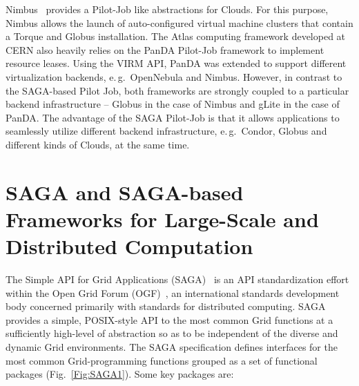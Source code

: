 \documentclass[conference,final]{IEEEtran}
\newcommand{\up}{\vspace*{-1em}}
\newcommand{\alnote}[1]{ {\textcolor{blue} { ***AL: #1 }}}
\newcommand{\jhanote}[1]{ {\textcolor{red} { ***SJ: #1 }}}
\newcommand{\alnote}[1]{}
\newcommand{\jhanote}[1]{}
\begin{document}
Nimbus~\cite{10.1109/MIC.2009.94} provides a Pilot-Job like
abstractions for Clouds. For this purpose, Nimbus allows the launch of
auto-configured virtual machine clusters that contain a Torque and
Globus installation.  The Atlas computing framework developed at CERN
also heavily relies on the PanDA Pilot-Job framework to implement
resource leases. Using the VIRM API, PanDA was extended to support
different virtualization backends, e.\,g.\ OpenNebula and
Nimbus. However, in contrast to the SAGA-based Pilot Job, both
frameworks are strongly coupled to a particular backend infrastructure
-- Globus in the case of Nimbus and gLite in the case of PanDA. The
advantage of the SAGA Pilot-Job is that it allows applications to
seamlessly utilize different backend infrastructure, e.\,g.\ Condor,
Globus and different kinds of Clouds, at the same time.




\up
\section{SAGA and SAGA-based Frameworks for Large-Scale and
  Distributed Computation} 
\up


The Simple API for Grid Applications (SAGA)~\cite{saga_url} is an API
standardization effort within the Open Grid Forum
(OGF)~\cite{saga_gfd90}, an international standards development body
concerned primarily with standards for distributed computing. SAGA
provides a simple, POSIX-style API to the most common Grid functions
at a sufficiently high-level of abstraction so as to be independent of
the diverse and dynamic Grid environments. The SAGA specification
defines interfaces for the most common Grid-programming functions
grouped as a set of functional packages (Fig.~\ref{Fig:SAGA1}). Some
key packages are:
\end{document}
